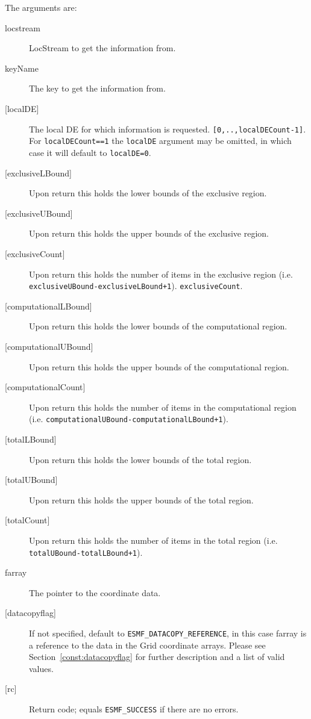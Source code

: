        The arguments are:
       \begin{description}
       \item[{locstream}]
            LocStream to get the information from.
       \item[{keyName}]
            The key to get the information from.
       \item[{[localDE]}]
           The local DE for which information is requested. {\tt [0,..,localDECount-1]}.
           For {\tt localDECount==1} the {\tt localDE} argument may be omitted,
            in which case it will default to {\tt localDE=0}.
       \item[{[exclusiveLBound]}]
            Upon return this holds the lower bounds of the exclusive region.
       \item[{[exclusiveUBound]}]
            Upon return this holds the upper bounds of the exclusive region.
       \item[{[exclusiveCount]}]
            Upon return this holds the number of items in the exclusive region \newline
            (i.e. {\tt exclusiveUBound-exclusiveLBound+1}). {\tt exclusiveCount}.
       \item[{[computationalLBound]}]
            Upon return this holds the lower bounds of the computational region.
       \item[{[computationalUBound]}]
            Upon return this holds the upper bounds of the computational region.
       \item[{[computationalCount]}]
            Upon return this holds the number of items in the computational region
            \newline
            (i.e. {\tt computationalUBound-computationalLBound+1}). 
       \item[{[totalLBound]}]
            Upon return this holds the lower bounds of the total region.
       \item[{[totalUBound]}]
            Upon return this holds the upper bounds of the total region.
       \item[{[totalCount]}]
            Upon return this holds the number of items in the total region
            (i.e. {\tt totalUBound-totalLBound+1}). 
       \item[{farray}]
            The pointer to the coordinate data.
       \item[{[datacopyflag]}]
            If not specified, default to {\tt ESMF\_DATACOPY\_REFERENCE}, in this case
            farray is a reference to the data in the Grid coordinate arrays. 
            Please see Section~\ref{const:datacopyflag} for further description and a
            list of valid values. 
       \item[{[rc]}]
            Return code; equals {\tt ESMF\_SUCCESS} if there are no errors.
     \end{description}
   
